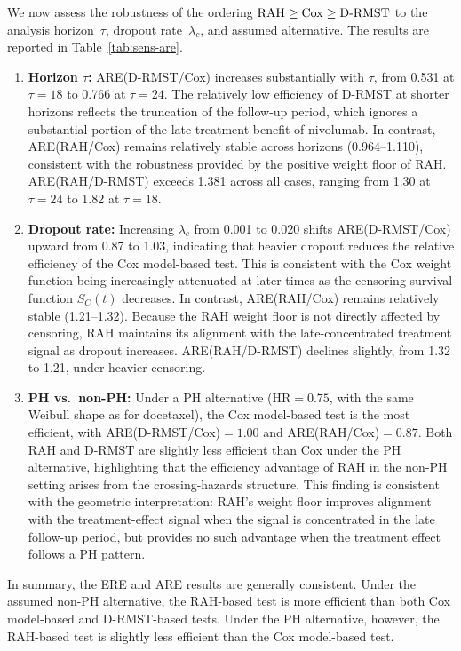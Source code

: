 \documentclass[12pt]{article}
\newcommand{\RAH}{\mathrm{RAH}}
\newcommand{\DRMST}{D\text{-}\mathrm{RMST}}
\begin{document}
We now assess the robustness of the ordering $\RAH \ge \rm{Cox} \ge \DRMST$
to the analysis horizon~$\tau$, dropout rate~$\lambda_c$, and assumed alternative. The results are reported in  Table~\ref{tab:sens-are}.
\begin{enumerate}
\item {\bf Horizon $\tau$:}
ARE(D-RMST/Cox) increases substantially with $\tau$, from 0.531 at $\tau=18$ to 0.766 at $\tau=24$. The relatively low efficiency of D-RMST at shorter horizons reflects the truncation of the follow-up period, which ignores a substantial portion of the late treatment benefit of nivolumab. In contrast, ARE(RAH/Cox) remains relatively stable across horizons (0.964--1.110), consistent with the robustness provided by the positive weight floor of RAH. ARE(RAH/D-RMST) exceeds 1.381 across all cases, ranging from 1.30 at $\tau=24$ to 1.82 at $\tau=18$.

\item {\bf Dropout rate:}
Increasing $\lambda_c$ from 0.001 to 0.020 shifts ARE(D-RMST/Cox) upward from 0.87 to 1.03, indicating that heavier dropout reduces the relative efficiency of the Cox model-based test. This is consistent with the Cox weight function being increasingly attenuated at later times as the censoring survival function $S_C(t)$ decreases. In contrast, ARE(RAH/Cox) remains relatively stable (1.21--1.32). Because the RAH weight floor is not directly affected by censoring, RAH maintains its alignment with the late-concentrated treatment signal as dropout increases. ARE(RAH/D-RMST) declines slightly, from 1.32 to 1.21, under heavier censoring.

\item {\bf PH vs.\ non-PH:}
Under a PH alternative (HR$=0.75$, with the same Weibull shape as for docetaxel), the Cox model-based test is the most efficient, with ARE(D-RMST/Cox)$=1.00$ and ARE(RAH/Cox)$=0.87$. Both RAH and D-RMST are slightly less efficient than Cox under the PH alternative, highlighting that the efficiency advantage of RAH in the non-PH setting arises from the crossing-hazards structure. This finding is consistent with the geometric interpretation: RAH's weight floor improves alignment with the treatment-effect signal when the signal is concentrated in the late follow-up period, but provides no such advantage when the treatment effect follows a PH pattern.
\end{enumerate}

In summary, the ERE and ARE results are generally consistent. Under the assumed non-PH alternative, the RAH-based test is more efficient than both Cox model-based and D-RMST-based tests. Under the PH alternative, however, the RAH-based test is slightly less efficient than the Cox model-based test.
\end{document}
